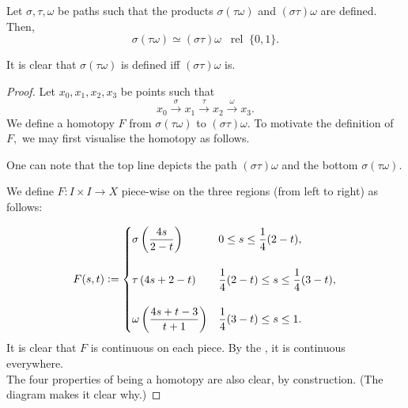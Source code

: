 \documentclass[12pt]{article}
\newcommand{\rel}{\;\;\operatorname{rel}\;}
\begin{document}
\begin{lem} \label{lem:prodassoc}
	Let $\sigma, \tau, \omega$ be paths such that the products $\sigma(\tau\omega)$ and $(\sigma\tau)\omega$ are defined. Then,
	\begin{equation*} 
		\sigma(\tau\omega) \simeq (\sigma\tau)\omega \rel \{0, 1\}.
	\end{equation*}
\end{lem}
It is clear that $\sigma(\tau\omega)$ is defined iff $(\sigma\tau)\omega$ is.
\begin{proof} 
	Let $x_0, x_1, x_2, x_3$ be points such that
	\begin{equation*} 
		x_0 \overset{\sigma}{\longrightarrow} x_1 \overset{\tau}{\longrightarrow} x_2 \overset{\omega}{\longrightarrow} x_3. 
	\end{equation*}
	We define a homotopy $F$ from $\sigma(\tau\omega)$ to $(\sigma\tau)\omega.$ To motivate the definition of $F,$ we may first visualise the homotopy as follows.
	\begin{center}
	\end{center}
	One can note that the top line depicts the path $(\sigma\tau)\omega$ and the bottom $\sigma(\tau\omega).$

	We define $F:I \times I \to X$ piece-wise on the three regions (from left to right) as follows:

	\begin{equation*} 
		F(s, t) \vcentcolon= \begin{cases}
			\sigma\left(\dfrac{4s}{2 - t}\right) & 0 \le s \le \dfrac{1}{4}(2 - t) ,\\~\\	\tau\left(4s + 2 - t\right) & \dfrac{1}{4}(2 - t) \le s \le \dfrac{1}{4}(3 - t),\\~\\
        	\omega\left(\dfrac{4s + t - 3}{t + 1}\right) & \dfrac{1}{4}(3 - t) \le s \le 1.
		\end{cases}
	\end{equation*}
	It is clear that $F$ is continuous on each piece. By the , it is continuous everywhere.\\
	The four properties of being a homotopy are also clear, by construction. (The diagram makes it clear why.)
\end{proof}
\end{document}
